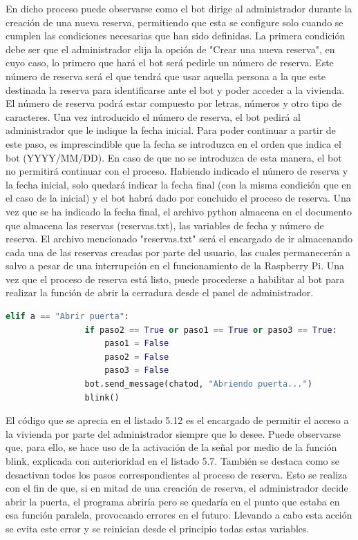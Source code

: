 En dicho proceso puede observarse como el bot dirige al administrador durante la creación de una nueva reserva, permitiendo que esta se configure solo cuando se cumplen las condiciones necesarias que han sido definidas.
La primera condición debe ser que el administrador elija la opción de "Crear una nueva reserva", en cuyo caso, lo primero que hará el bot será pedirle un número de reserva. Este número de reserva será el que tendrá que usar aquella persona a la que este destinada la reserva para identificarse ante el bot y poder acceder a la vivienda. El número de reserva podrá estar compuesto por letras, números y otro tipo de caracteres.
Una vez introducido el número de reserva, el bot pedirá al administrador que le indique la fecha inicial. Para poder continuar a partir de este paso, es imprescindible que la fecha se introduzca en el orden que indica el bot (YYYY/MM/DD). En caso de que no se introduzca de esta manera, el bot no permitirá continuar con el proceso.
Habiendo indicado el número de reserva y la fecha inicial, solo quedará indicar la fecha final (con la misma condición que en el caso de la inicial) y el bot habrá dado por concluido el proceso de reserva.
Una vez que se ha indicado la fecha final, el archivo python almacena en el documento que almacena las reservas (reservas.txt), las variables de fecha y número de reserva.
El archivo mencionado "reservas.txt" será el encargado de ir almacenando cada una de las reservas creadas por parte del usuario, las cuales permanecerán a salvo a pesar de una interrupción en el funcionamiento de la Raspberry Pi.
Una vez que el proceso de reserva está listo, puede procederse a habilitar al bot para realizar la función de abrir la cerradura desde el panel de administrador.
\begin{lstlisting}[language=Python,
    caption={Apertura de puertas desde el panel de administración},
    label=src:apertura-puertas-panel-administrador
]
            elif a == "Abrir puerta":
                if paso2 == True or paso1 == True or paso3 == True:
                    paso1 = False
                    paso2 = False
                    paso3 = False
                bot.send_message(chatod, "Abriendo puerta...")
                blink()
\end{lstlisting}
El código que se aprecia en el listado 5.12 es el encargado de permitir el acceso a la vivienda por parte del administrador siempre que lo desee. Puede observarse que, para ello, se hace uso de la activación de la señal por medio de la función blink, explicada con anterioridad en el listado 5.7.
También se destaca como se desactivan todos los pasos correspondientes al proceso de reserva. Esto se realiza con el fin de que, si en mitad de una creación de reserva, el administrador decide abrir la puerta, el programa abriría pero se quedaría en el punto que estaba en esa función paralela, provocando errores en el futuro. Llevando a cabo esta acción se evita este error y se reinician desde el principio todas estas variables.

